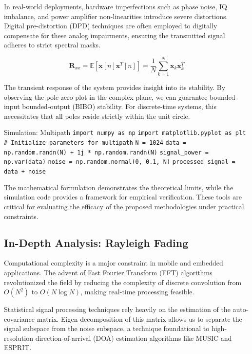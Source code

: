 In real-world deployments, hardware imperfections such as phase noise, IQ imbalance, and power amplifier non-linearities introduce severe distortions. Digital pre-distortion (DPD) techniques are often employed to digitally compensate for these analog impairments, ensuring the transmitted signal adheres to strict spectral masks.

\begin{equation}
    \mathbf{R}_{xx} = \mathbb{E}[\mathbf{x}[n]\mathbf{x}^T[n]] = \frac{1}{N} \sum_{k=1}^{N} \mathbf{x}_k \mathbf{x}_k^T
\end{equation}

The transient response of the system provides insight into its stability. By observing the pole-zero plot in the complex plane, we can guarantee bounded-input bounded-output (BIBO) stability. For discrete-time systems, this necessitates that all poles reside strictly within the unit circle.

\begin{pythonbox}{Simulation: Multipath}
\texttt{import numpy as np}
\texttt{import matplotlib.pyplot as plt}
\texttt{}
\texttt{\# Initialize parameters for multipath}
\texttt{N = 1024}
\texttt{data = np.random.randn(N) + 1j * np.random.randn(N)}
\texttt{signal\_power = np.var(data)}
\texttt{noise = np.random.normal(0, 0.1, N)}
\texttt{processed\_signal = data + noise}
\end{pythonbox}

\vspace{0.5cm}
The mathematical formulation demonstrates the theoretical limits, while the simulation code provides a framework for empirical verification. These tools are critical for evaluating the efficacy of the proposed methodologies under practical constraints.


\subsection{In-Depth Analysis: Rayleigh Fading}
Computational complexity is a major constraint in mobile and embedded applications. The advent of Fast Fourier Transform (FFT) algorithms revolutionized the field by reducing the complexity of discrete convolution from $O(N^2)$ to $O(N \log N)$, making real-time processing feasible.

Statistical signal processing techniques rely heavily on the estimation of the auto-covariance matrix. Eigen-decomposition of this matrix allows us to separate the signal subspace from the noise subspace, a technique foundational to high-resolution direction-of-arrival (DOA) estimation algorithms like MUSIC and ESPRIT.

